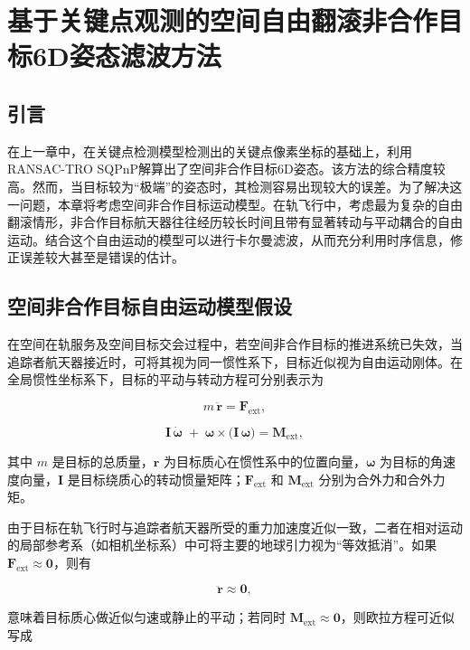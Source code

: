 \chapter{基于关键点观测的空间自由翻滚非合作目标6D姿态滤波方法}
\label{chap:SpaceFreeMotionEKF}
\section{引言}
在上一章中，在关键点检测模型检测出的关键点像素坐标的基础上，利用RANSAC-TRO SQPnP解算出了空间非合作目标6D姿态。该方法的综合精度较高。然而，当目标较为“极端”的姿态时，其检测容易出现较大的误差。为了解决这一问题，本章将考虑空间非合作目标运动模型。在轨飞行中，考虑最为复杂的自由翻滚情形，非合作目标航天器往往经历较长时间且带有显著转动与平动耦合的自由运动。结合这个自由运动的模型可以进行卡尔曼滤波，从而充分利用时序信息，修正误差较大甚至是错误的估计。

\section{空间非合作目标自由运动模型假设}
在空间在轨服务及空间目标交会过程中，若空间非合作目标的推进系统已失效，当追踪者航天器接近时，可将其视为同一惯性系下，目标近似视为自由运动刚体。在全局惯性坐标系下，目标的平动与转动方程可分别表示为

\begin{equation}
	m\,\ddot{\mathbf{r}} = \mathbf{F}_\mathrm{ext},
\end{equation}

\begin{equation}
	\mathbf{I}\,\dot{\boldsymbol{\omega}}
	\;+\;
	\boldsymbol{\omega} \times \bigl(\mathbf{I}\,\boldsymbol{\omega}\bigr)
	= \mathbf{M}_\mathrm{ext},
\end{equation}

其中 \(m\) 是目标的总质量，\(\mathbf{r}\) 为目标质心在惯性系中的位置向量，\(\boldsymbol{\omega}\) 为目标的角速度向量，\(\mathbf{I}\) 是目标绕质心的转动惯量矩阵；\(\mathbf{F}_\mathrm{ext}\) 和 \(\mathbf{M}_\mathrm{ext}\) 分别为合外力和合外力矩。

由于目标在轨飞行时与追踪者航天器所受的重力加速度近似一致，二者在相对运动的局部参考系（如相机坐标系）中可将主要的地球引力视为“等效抵消”。如果 \(\mathbf{F}_\mathrm{ext} \approx \mathbf{0}\)，则有

\begin{equation}
	\ddot{\mathbf{r}} \approx \mathbf{0},
\end{equation}

意味着目标质心做近似匀速或静止的平动；若同时 \(\mathbf{M}_\mathrm{ext} \approx \mathbf{0}\)，则欧拉方程可近似写成

